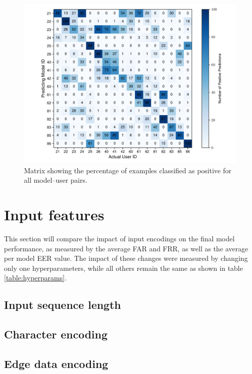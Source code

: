 \begin{figure}[H]
	\centering
	\includegraphics[width=\textwidth]{images/all_models_5_len40.pdf} %
	\caption{Matrix showing the percentage of examples classified as positive for all model--user pairs.}
	\label{fig:all_models_5_len40}
\end{figure}



\section{Input features}
This section will compare the impact of input encodings on the final model performance, as measured by the average FAR and FRR, as well as the average per model EER value. The impact of these changes were measured by changing only one hyperparameters, while all others remain the same as shown in table \ref{table:hyperparams}.

\subsection{Input sequence length}

\subsection{Character encoding}


\subsection{Edge data encoding}

